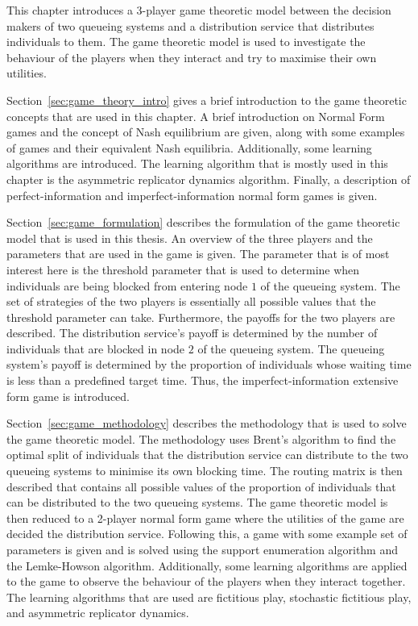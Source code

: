 This chapter introduces a 3-player game theoretic model between the decision 
makers of two queueing systems and a distribution service that distributes
individuals to them.
The game theoretic model is used to investigate the behaviour of the players
when they interact and try to maximise their own utilities.

Section~\ref{sec:game_theory_intro} gives a brief introduction to the game
theoretic concepts that are used in this chapter.
A brief introduction on Normal Form games and the concept of Nash equilibrium
are given, along with some examples of games and their equivalent Nash
equilibria.
Additionally, some learning algorithms are introduced.
The learning algorithm that is mostly used in this chapter is the
asymmetric replicator dynamics algorithm.
Finally, a description of perfect-information and imperfect-information normal
form games is given.

Section~\ref{sec:game_formulation} describes the formulation of the game
theoretic model that is used in this thesis.
An overview of the three players and the parameters that are used in the game
is given.
The parameter that is of most interest here is the threshold parameter that
is used to determine when individuals are being blocked from entering node
\(1\) of the queueing system.
The set of strategies of the two players is essentially all possible values
that the threshold parameter can take.
Furthermore, the payoffs for the two players are described.
The distribution service's payoff is determined by the number of individuals
that are blocked in node \(2\) of the queueing system.
The queueing system's payoff is determined by the proportion of individuals
whose waiting time is less than a predefined target time.
Thus, the imperfect-information extensive form game is introduced.

Section~\ref{sec:game_methodology} describes the methodology that is used to
solve the game theoretic model.
The methodology uses Brent's algorithm to find
the optimal split of individuals that the distribution service can distribute
to the two queueing systems to minimise its own blocking time.
The routing matrix is then described that contains all possible values of the
proportion of individuals that can be distributed to the two queueing systems.
The game theoretic model is then reduced to a 2-player normal form game where
the utilities of the game are decided the distribution service.
Following this, a game with some example set of parameters is given and
is solved using the support enumeration algorithm and the Lemke-Howson
algorithm.
Additionally, some learning algorithms are applied to the game to observe
the behaviour of the players when they interact together.
The learning algorithms that are used are fictitious play, stochastic
fictitious play, and asymmetric replicator dynamics.

